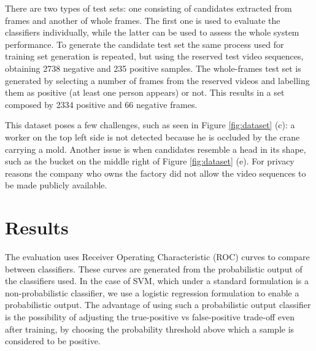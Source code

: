 There are two types of test sets: one consisting of candidates extracted from frames and another of whole frames. The first one is used to evaluate the classifiers individually, while the latter can be used to assess the whole system performance. To generate the candidate test set the same process used for training set generation is repeated, but using the reserved test video sequences, obtaining 2738 negative and 235 positive samples. The whole-frames test set is generated by selecting a number of frames from the reserved videos and labelling them as positive (at least one person appears) or not. This results in a set composed by 2334 positive and 66 negative frames.

This dataset poses a few challenges, such as seen in Figure \ref{fig:dataset} (c): a worker on the top left side is not detected because he is occluded by the crane carrying a mold. Another issue is when candidates resemble a head in its shape, such as the bucket on the middle right of Figure \ref{fig:dataset} (e).  For privacy reasons the company who owns the factory did not allow the video sequences to be made publicly available.

\begin{figure*}[!t]
\centering
{}%
\hfil
{}%

%
\hfil
{}%

%
\hfil
{}%
\caption{Dataset examples. Images in first column are RGB and on the right are corresponding depth images. The bounding boxes in the images are obtained by the candidate detection algorithm.}
\label{fig:dataset}
\end{figure*}


\section{Results}
\label{sec:results}

    The evaluation uses Receiver Operating Characteristic (ROC) curves \cite{evaluationMetrics} to compare between classifiers. These curves are generated from the probabilistic output of the classifiers used. In the case of SVM, which under a standard formulation is a non-probabilistic classifier, we use a logistic regression formulation \cite{svmProbabilisticOutput} to enable a probabilistic output. The advantage of using such a probabilistic output classifier is the possibility of adjusting the true-positive vs false-positive trade-off even after training, by choosing the probability threshold above which a sample is considered to be positive.


